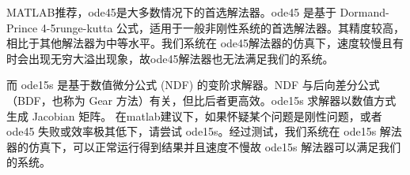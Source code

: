 \begin{itemize}
	MATLAB推荐，ode45是大多数情况下的首选解法器。ode45 是基于 Dormand-Prince 4-5runge-kutta 公式，适用于一般非刚性系统的首选解法器。其精度较高，相比于其他解法器为中等水平。我们系统在 ode45解法器的仿真下，速度较慢且有时会出现无穷大溢出现象，故ode45解法器也无法满足我们的系统。
	
	而 ode15s 是基于数值微分公式 (NDF) 的变阶求解器。NDF 与后向差分公式（BDF，也称为 Gear 方法）有关，但比后者更高效。ode15s 求解器以数值方式生成 Jacobian 矩阵。
	在matlab建议下，如果怀疑某个问题是刚性问题，或者 ode45 失败或效率极其低下，请尝试 ode15s。经过测试，我们系统在 ode15s 解法器的仿真下，可以正常运行得到结果并且速度不慢故 ode15s 解法器可以满足我们的系统。
	
\end{itemize}
